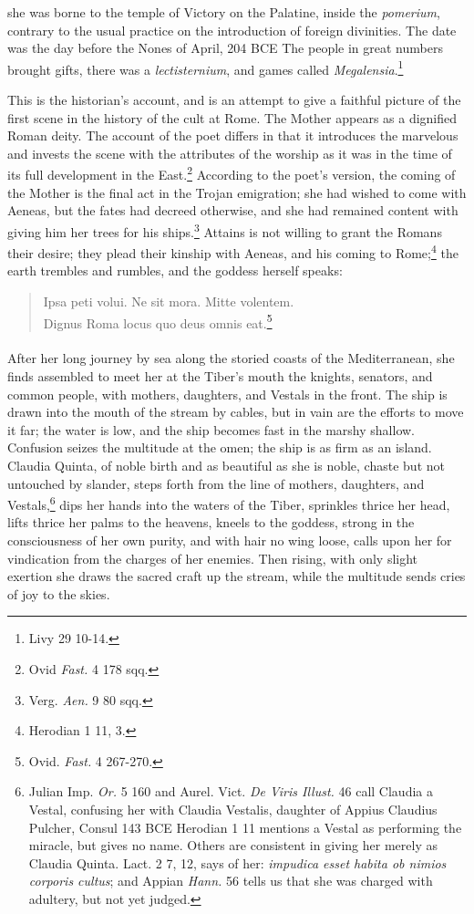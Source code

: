 \documentclass[a4paper, 11pt, oneside, polutonikogreek, english]{article}
\begin{document}
she was borne to the temple of Victory on the Palatine, inside the \emph{pomerium}, contrary to the usual practice on the introduction of foreign divinities. The date was the day before the Nones of April, 204 \textsc{BCE} The people in great numbers brought gifts, there was a \emph{lectisternium}, and games called \emph{Megalensia}.\footnote{Livy 29 10-14.}

This is the historian's account, and is an attempt to give a faithful picture of the first scene in the history of the cult at Rome. The Mother appears as a dignified Roman deity. The account of the poet differs in that it introduces the marvelous and invests the scene with the attributes of the worship as it was in the time of its full development in the East.\footnote{Ovid \emph{Fast.} 4 178 sqq.} According to the poet's version, the coming of the Mother is the final act in the Trojan emigration; she had wished to come with Aeneas, but the fates had decreed otherwise, and she had remained content with giving him her trees for his ships.\footnote{Verg. \emph{Aen.} 9 80 sqq.} Attains is not willing to grant the Romans their desire; they plead their kinship with Aeneas, and his coming to Rome;\footnote{Herodian 1 11, 3.} the earth trembles and rumbles, and the goddess herself speaks:
\begin{quote}
Ipsa peti volui. Ne sit mora. Mitte volentem.\\ Dignus Roma locus quo deus omnis eat.\footnote{Ovid. \emph{Fast.} 4 267-270.}  
\end{quote}
\paragraph{}
After her long journey by sea along the storied coasts of the Mediterranean, she finds assembled to meet her at the Tiber's mouth the knights, senators, and common people, with mothers, daughters, and Vestals in the front. The ship is drawn into the mouth of the stream by cables, but in vain are the efforts to move it far; the water is low, and the ship becomes fast in the marshy shallow. Confusion seizes the multitude at the omen; the ship is as firm as an island. Claudia Quinta, of noble birth and as beautiful as she is noble, chaste but not untouched by slander, steps forth from the line of mothers, daughters, and Vestals,\footnote{Julian Imp. \emph{Or.} 5 160 and Aurel. Vict. \emph{De Viris Illust.} 46 call Claudia a Vestal, confusing her with Claudia Vestalis, daughter of Appius Claudius Pulcher, Consul 143 \textsc{BCE} Herodian 1 11 mentions a Vestal as performing the miracle, but gives no name. Others are consistent in giving her merely as Claudia Quinta. Lact. 2 7, 12, says of her: \emph{impudica esset habita ob nimios corporis cultus}; and Appian \emph{Hann.} 56 tells us that she was charged with adultery, but not yet judged.} dips her hands into the waters of the Tiber, sprinkles thrice her head, lifts thrice her palms to the heavens, kneels to the goddess, strong in the consciousness of her own purity, and with hair no wing loose, calls upon her for vindication from the charges of her enemies. Then rising, with only slight exertion she draws the sacred craft up the stream, while the multitude sends cries of joy to the skies.
\end{document}
